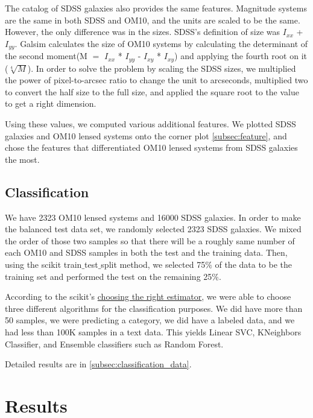 \documentclass[\docopts]{\docclass}
\begin{document}
The catalog of SDSS galaxies also provides the same features. Magnitude systems are the same in both SDSS and OM10, and the units are scaled to be the same. However, the only difference was in the sizes. SDSS's definition of size was $I_{xx}$ + $I_{yy}$. Galsim calculates the size of OM10 systems by calculating the determinant of the second moment(M $=$ $I_{xx}$ * $I_{yy}$ - $I_{xy}$ * $I_{xy}$) and applying the fourth root on it ($\sqrt[4]{M}$). In order to solve the problem by scaling the SDSS sizes, we multiplied the power of pixel-to-arcsec ratio to change the unit to arcseconds, multiplied two to convert the half size to the full size, and applied the square root to the value to get a right dimension.

Using these values, we computed various additional features. We plotted SDSS galaxies and OM10 lensed systems onto the corner plot \ref{subsec:feature}, and chose the features that differentiated OM10 lensed systems from SDSS galaxies the most.

\subsection{Classification}
\label{subsec:classification}

We have 2323 OM10 lensed systems and 16000 SDSS galaxies. In order to make the balanced test data set, we randomly selected 2323 SDSS galaxies. We mixed the order of those two samples so that there will be a roughly same number of each OM10 and SDSS samples in both the test and the training data. Then, using the scikit train$\_$test$\_$split method, we selected 75$\%$ of the data to be the training set and performed the test on the remaining 25$\%$.

According to the scikit's \href{http://scikit-learn.org/stable/tutorial/machine_learning_map/index.html} {choosing the right estimator}, we were able to choose three different algorithms for the classification purposes. We did have more than 50 samples, we were predicting a category, we did have a labeled data, and we had less than 100K samples in a text data. This yields Linear SVC, KNeighbors Classifier, and Ensemble classifiers such as Random Forest.

Detailed results are in \ref{subsec:classification_data}.


\section{Results}
\label{sec:results}
\end{document}
